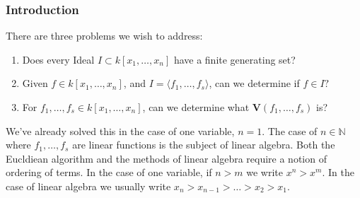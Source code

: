 \documentclass[oneside]{book}
\theoremstyle{mystyle}
\begin{document}
\subsubsection{Introduction}
There are three problems we wish to address:
\begin{enumerate}
    \item Does every Ideal $I\subset k[x_1,\hdots ,x_n]$ have a finite generating set?
    \item Given $f\in k[x_1,\hdots ,x_n]$, and $I = \langle f_1,\hdots, f_s\rangle$, can we determine if $f\in I?$
    \item For $f_1,\hdots, f_s \in k[x_1,\hdots ,x_n]$, can we determine what $\mathbf{V}(f_1,\hdots, f_s)$ is?
\end{enumerate}
We've already solved this in the case of one variable, $n=1$. The case of $n\in \mathbb{N}$ where $f_1,\hdots, f_s$ are linear functions is the subject of linear algebra. Both the Eucldiean algorithm and the methods of linear algebra require a notion of ordering of terms. In the case of one variable, if $n>m$ we write $x^n>x^m$. In the case of linear algebra we usually write $x_n>x_{n-1}>\hdots > x_2 > x_1$. 
\end{document}
